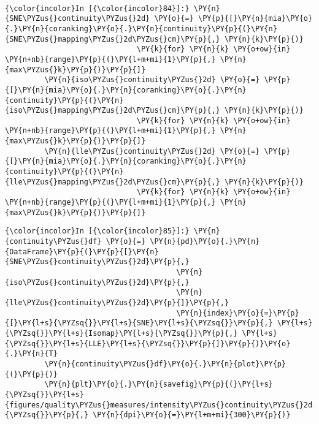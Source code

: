     \begin{center}
    \end{center}
    { \hspace*{\fill} \\}

    \begin{Verbatim}[commandchars=\\\{\}]
{\color{incolor}In [{\color{incolor}84}]:} \PY{n}{SNE\PYZus{}continuity\PYZus{}2d} \PY{o}{=} \PY{p}{[}\PY{n}{mia}\PY{o}{.}\PY{n}{coranking}\PY{o}{.}\PY{n}{continuity}\PY{p}{(}\PY{n}{SNE\PYZus{}mapping\PYZus{}2d\PYZus{}cm}\PY{p}{,} \PY{n}{k}\PY{p}{)}
                              \PY{k}{for} \PY{n}{k} \PY{o+ow}{in} \PY{n+nb}{range}\PY{p}{(}\PY{l+m+mi}{1}\PY{p}{,} \PY{n}{max\PYZus{}k}\PY{p}{)}\PY{p}{]}
         \PY{n}{iso\PYZus{}continuity\PYZus{}2d} \PY{o}{=} \PY{p}{[}\PY{n}{mia}\PY{o}{.}\PY{n}{coranking}\PY{o}{.}\PY{n}{continuity}\PY{p}{(}\PY{n}{iso\PYZus{}mapping\PYZus{}2d\PYZus{}cm}\PY{p}{,} \PY{n}{k}\PY{p}{)}
                              \PY{k}{for} \PY{n}{k} \PY{o+ow}{in} \PY{n+nb}{range}\PY{p}{(}\PY{l+m+mi}{1}\PY{p}{,} \PY{n}{max\PYZus{}k}\PY{p}{)}\PY{p}{]}
         \PY{n}{lle\PYZus{}continuity\PYZus{}2d} \PY{o}{=} \PY{p}{[}\PY{n}{mia}\PY{o}{.}\PY{n}{coranking}\PY{o}{.}\PY{n}{continuity}\PY{p}{(}\PY{n}{lle\PYZus{}mapping\PYZus{}2d\PYZus{}cm}\PY{p}{,} \PY{n}{k}\PY{p}{)}
                              \PY{k}{for} \PY{n}{k} \PY{o+ow}{in} \PY{n+nb}{range}\PY{p}{(}\PY{l+m+mi}{1}\PY{p}{,} \PY{n}{max\PYZus{}k}\PY{p}{)}\PY{p}{]}
\end{Verbatim}

    \begin{Verbatim}[commandchars=\\\{\}]
{\color{incolor}In [{\color{incolor}85}]:} \PY{n}{continuity\PYZus{}df} \PY{o}{=} \PY{n}{pd}\PY{o}{.}\PY{n}{DataFrame}\PY{p}{(}\PY{p}{[}\PY{n}{SNE\PYZus{}continuity\PYZus{}2d}\PY{p}{,}
                                       \PY{n}{iso\PYZus{}continuity\PYZus{}2d}\PY{p}{,}
                                       \PY{n}{lle\PYZus{}continuity\PYZus{}2d}\PY{p}{]}\PY{p}{,}
                                       \PY{n}{index}\PY{o}{=}\PY{p}{[}\PY{l+s}{\PYZsq{}}\PY{l+s}{SNE}\PY{l+s}{\PYZsq{}}\PY{p}{,} \PY{l+s}{\PYZsq{}}\PY{l+s}{Isomap}\PY{l+s}{\PYZsq{}}\PY{p}{,} \PY{l+s}{\PYZsq{}}\PY{l+s}{LLE}\PY{l+s}{\PYZsq{}}\PY{p}{]}\PY{p}{)}\PY{o}{.}\PY{n}{T}
         \PY{n}{continuity\PYZus{}df}\PY{o}{.}\PY{n}{plot}\PY{p}{(}\PY{p}{)}
         \PY{n}{plt}\PY{o}{.}\PY{n}{savefig}\PY{p}{(}\PY{l+s}{\PYZsq{}}\PY{l+s}{figures/quality\PYZus{}measures/intensity\PYZus{}continuity\PYZus{}2d.png}\PY{l+s}{\PYZsq{}}\PY{p}{,} \PY{n}{dpi}\PY{o}{=}\PY{l+m+mi}{300}\PY{p}{)}
\end{Verbatim}

